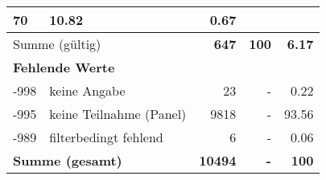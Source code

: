 \begin{longtable}{lXrrr}
       \num{70} &
       \num[round-mode=places,round-precision=2]{10,82} &
         \num[round-mode=places,round-precision=2]{0,67} \\
     \midrule
     \multicolumn{2}{l}{Summe (gültig)} &
       \textbf{\num{647}} &
     \textbf{100} &
       \textbf{\num[round-mode=places,round-precision=2]{6,17}} \\
     \multicolumn{5}{l}{\textbf{Fehlende Werte}}\\
       -998 &
       keine Angabe &
         \num{23} &
        - &
         \num[round-mode=places,round-precision=2]{0,22} \\
       -995 &
       keine Teilnahme (Panel) &
         \num{9818} &
        - &
         \num[round-mode=places,round-precision=2]{93,56} \\
       -989 &
       filterbedingt fehlend &
         \num{6} &
        - &
         \num[round-mode=places,round-precision=2]{0,06} \\
     \midrule
     \multicolumn{2}{l}{\textbf{Summe (gesamt)}} &
          \textbf{\num{10494}} &
        \textbf{-} &
        \textbf{100} \\
     \bottomrule
     \end{longtable}
     
